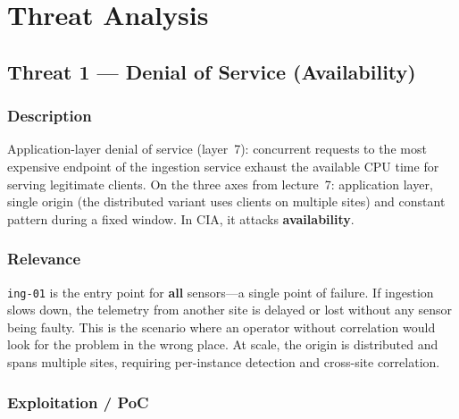 \documentclass[11pt,a4paper]{article}
\begin{document}
\section{Threat Analysis}
\label{sec:threats}

\subsection{Threat 1 --- Denial of Service (Availability)}
\label{sec:t1}

\subsubsection{Description}

Application-layer denial of service (layer~7): concurrent requests to the most expensive
endpoint of the ingestion service exhaust the available CPU time for serving legitimate
clients. On the three axes from lecture~7: application layer, single origin (the distributed
variant uses clients on multiple sites) and constant pattern during a fixed window. In CIA,
it attacks \textbf{availability}.

\subsubsection{Relevance}

\texttt{ing-01} is the entry point for \textbf{all} sensors---a single point of failure. If
ingestion slows down, the telemetry from another site is delayed or lost without any sensor
being faulty. This is the scenario where an operator without correlation would look for the
problem in the wrong place. At scale, the origin is distributed and spans multiple sites,
requiring per-instance detection and cross-site correlation.

\subsubsection{Exploitation / PoC}
\end{document}
